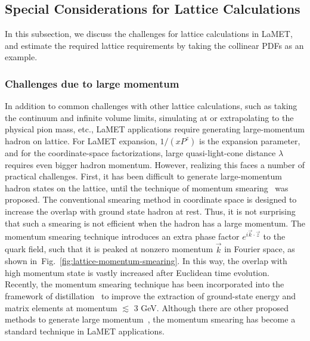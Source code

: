 \documentclass[aps,rmp,reprint,amsmath,amssymb,graphicx,longbibliography]{revtex4-1} %
\DeclareRobustCommand{\fig}[1]{Fig.~\ref{fig:#1}}
\begin{document}
\subsection{Special Considerations for Lattice Calculations}
\label{sec:lattice-lattice}

In this subsection, we discuss the challenges for lattice calculations in LaMET, and estimate the required lattice
requirements by taking the collinear PDFs as an example.

\subsubsection{Challenges due to large momentum}
\label{sec:lattice-lattice-challenges}

In addition to common challenges with other lattice calculations, such as taking the continuum and infinite volume limits, simulating at or extrapolating to the physical pion mass, etc., LaMET applications
require generating large-momentum hadron on lattice. For LaMET expansion,
$1/(xP^z)$ is the expansion parameter, and for the coordinate-space factorizations, large
quasi-light-cone distance $\lambda$ requires even bigger hadron momentum.
However, realizing this faces a number of practical challenges.
First, it has been difficult to generate large-momentum hadron states on the lattice, until the technique of momentum smearing~\cite{Bali:2016lva} was proposed.
The conventional smearing method in coordinate space is designed to increase the overlap with ground state hadron at rest. Thus, it is not surprising that such a smearing is not efficient when the hadron has a large momentum.
The momentum smearing technique introduces an extra phase factor $e^{i\vec{k}\cdot \vec{z}}$ to the quark field,
such that it is peaked at nonzero momentum $\vec{k}$ in Fourier space, as shown in~\fig{lattice-momentum-smearing}.
In this way, the overlap with high momentum state is vastly increased after Euclidean time evolution. Recently, the momentum smearing technique has been incorporated into the framework of distillation~\cite{Egerer:2020hnc} to improve the extraction of ground-state energy and matrix elements at momentum $\lesssim$ 3 GeV.
%
Although there are other proposed methods to generate large momentum~\cite{Wu:2018tvt}, the momentum smearing has become a standard technique in LaMET applications.
\end{document}
